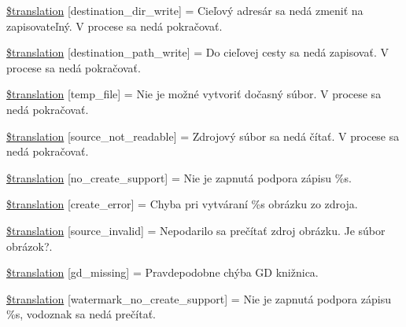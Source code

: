 \begin{DoxyCompactItemize}
\item 
\hyperlink{class_8upload_8sk___s_k_8php_a97608ea194a616db49141a0e6dee900c}{\$translation} \mbox{[}\textquotesingle{}destination\+\_\+dir\+\_\+write\textquotesingle{}\mbox{]} = \textquotesingle{}Cieľový adresár sa nedá zmeniť na zapisovateľný. V procese sa nedá pokračovať.\textquotesingle{}
\item 
\hyperlink{class_8upload_8sk___s_k_8php_a40e4e1962226b89fd76da5819a9602b0}{\$translation} \mbox{[}\textquotesingle{}destination\+\_\+path\+\_\+write\textquotesingle{}\mbox{]} = \textquotesingle{}Do cieľovej cesty sa nedá zapisovať. V procese sa nedá pokračovať.\textquotesingle{}
\item 
\hyperlink{class_8upload_8sk___s_k_8php_a2baece8da11e20d45175db91851ec3e3}{\$translation} \mbox{[}\textquotesingle{}temp\+\_\+file\textquotesingle{}\mbox{]} = \textquotesingle{}Nie je možné vytvoriť dočasný súbor. V procese sa nedá pokračovať.\textquotesingle{}
\item 
\hyperlink{class_8upload_8sk___s_k_8php_a922967ca2df0efdd455261142d8e5715}{\$translation} \mbox{[}\textquotesingle{}source\+\_\+not\+\_\+readable\textquotesingle{}\mbox{]} = \textquotesingle{}Zdrojový súbor sa nedá čítať. V procese sa nedá pokračovať.\textquotesingle{}
\item 
\hyperlink{class_8upload_8sk___s_k_8php_a346dfd1ade29f583dd20d345c436859f}{\$translation} \mbox{[}\textquotesingle{}no\+\_\+create\+\_\+support\textquotesingle{}\mbox{]} = \textquotesingle{}Nie je zapnutá podpora zápisu \%s.\textquotesingle{}
\item 
\hyperlink{class_8upload_8sk___s_k_8php_a53013ce9255c4e1849098ddd9fdb2b3f}{\$translation} \mbox{[}\textquotesingle{}create\+\_\+error\textquotesingle{}\mbox{]} = \textquotesingle{}Chyba pri vytváraní \%s obrázku zo zdroja.\textquotesingle{}
\item 
\hyperlink{class_8upload_8sk___s_k_8php_a6ab0a660b457eaf2d3434b225449fdd6}{\$translation} \mbox{[}\textquotesingle{}source\+\_\+invalid\textquotesingle{}\mbox{]} = \textquotesingle{}Nepodarilo sa prečítať zdroj obrázku. Je súbor obrázok?.\textquotesingle{}
\item 
\hyperlink{class_8upload_8sk___s_k_8php_a7f3dfcc0db4bbc0f2e7210c439798e56}{\$translation} \mbox{[}\textquotesingle{}gd\+\_\+missing\textquotesingle{}\mbox{]} = \textquotesingle{}Pravdepodobne chýba G\+D knižnica.\textquotesingle{}
\item 
\hyperlink{class_8upload_8sk___s_k_8php_a82d5853430ab72dc1f9799ec36144cc6}{\$translation} \mbox{[}\textquotesingle{}watermark\+\_\+no\+\_\+create\+\_\+support\textquotesingle{}\mbox{]} = \textquotesingle{}Nie je zapnutá podpora zápisu \%s, vodoznak sa nedá prečítať.\textquotesingle{}

\end{DoxyCompactItemize}
